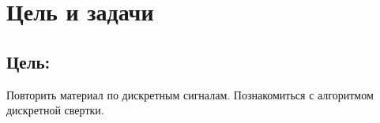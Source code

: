 \chapter*{Цель и задачи}
\label{ch:intro}

\section*{\textbf{Цель:}}

Повторить материал по дискретным сигналам. Познакомиться с алгоритмом дискретной свертки.

\endinput